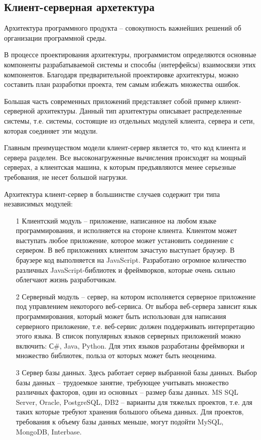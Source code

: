 \subsection{Клиент-серверная архетектура}

Архитектура программного продукта – совокупность важнейших решений об организации программной среды. 

В процессе проектирования архитектуры, программистом определяются основные компоненты разрабатываемой системы и способы (интерфейсы) взаимосвязи этих компонентов. Благодаря предварительной проектировке архитектуры, можно составить план разработки проекта, тем самым избежать множества ошибок.

Большая часть современных приложений представляет собой пример клиент-серверной архитектуры. Данный тип архитектуры описывает распределенные системы, т.е. системы, состоящие из отдельных модулей клиента, сервера и сети, которая соединяет эти модули. 

Главным преимуществом модели клиент-сервер является то, что код клиента и сервера разделен. Все высоконагруженные вычисления происходят на мощный серверах, а клиентская машина, к которым предъявляются менее серьезные требования, не несет большой нагрузки.

Архитектура клиент-сервер в большинстве случаев содержит три типа независимых модулей:
\begin{enumerate}
	\item[1] Клиентский модуль – приложение, написанное на любом языке программирования, и исполняется на стороне клиента. Клиентом может выступать любое приложение, которое может установить соединение с сервером. В веб приложениях клиентом зачастую выступает браузер. В браузере код выполняется на JavaScript. Разработано огромное количество различных JavaScript-библиотек и фреймворков, которые очень сильно облегчают жизнь разработчикам.
	\item[2] Серверный модуль – сервер, на котором исполняется серверное приложение под управлением некоторого веб-сервиса. От выбора веб-сервера зависит язык программирования, который может быть использован для написания серверного приложение, т.е. веб-сервис должен поддерживать интерпретацию этого языка. В список популярных языков серверных приложений можно включить: С\#, Java, Python. Для этих языков разработаны фреймворки и множество библиотек, польза от которых может быть неоценима.
	\item[3] Сервер базы данных. Здесь работает сервер выбранной базы данных. Выбор базы данных – трудоемкое занятие, требующее учитывать множество различных факторов, один из основных – размер базы данных. MS SQL Server, Oracle, PostgreSQL, DB2 – варианты для тяжелых проектов, т.е. для таких которые требуют хранения большого объема данных. Для проектов, требования к объему базы данных меньше, могут подойти MySQL, MongoDB, Interbase.
\end{enumerate}

